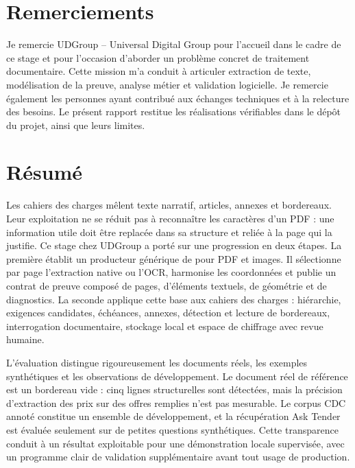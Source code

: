 \chapter*{Remerciements}
Je remercie UDGroup -- Universal Digital Group pour l'accueil dans le cadre de ce stage et pour l'occasion d'aborder un problème concret de traitement documentaire. Cette mission m'a conduit à articuler extraction de texte, modélisation de la preuve, analyse métier et validation logicielle. Je remercie également les personnes ayant contribué aux échanges techniques et à la relecture des besoins. Le présent rapport restitue les réalisations vérifiables dans le dépôt du projet, ainsi que leurs limites.
\clearpage
\chapter*{Résumé}
Les cahiers des charges mêlent texte narratif, articles, annexes et bordereaux. Leur exploitation ne se réduit pas à reconnaître les caractères d'un PDF : une information utile doit être replacée dans sa structure et reliée à la page qui la justifie. Ce stage chez UDGroup a porté sur une progression en deux étapes. La première établit un producteur générique de \DI{} pour PDF et images. Il sélectionne par page l'extraction native ou l'OCR, harmonise les coordonnées et publie un contrat de preuve composé de pages, d'éléments textuels, de géométrie et de diagnostics. La seconde applique cette base aux cahiers des charges : hiérarchie, exigences candidates, échéances, annexes, détection et lecture de bordereaux, interrogation documentaire, stockage local et espace de chiffrage avec revue humaine.

L'évaluation distingue rigoureusement les documents réels, les exemples synthétiques et les observations de développement. Le document réel de référence est un bordereau vide : cinq lignes structurelles sont détectées, mais la précision d'extraction des prix sur des offres remplies n'est pas mesurable. Le corpus CDC annoté constitue un ensemble de développement, et la récupération Ask Tender est évaluée seulement sur de petites questions synthétiques. Cette transparence conduit à un résultat exploitable pour une démonstration locale supervisée, avec un programme clair de validation supplémentaire avant tout usage de production.

